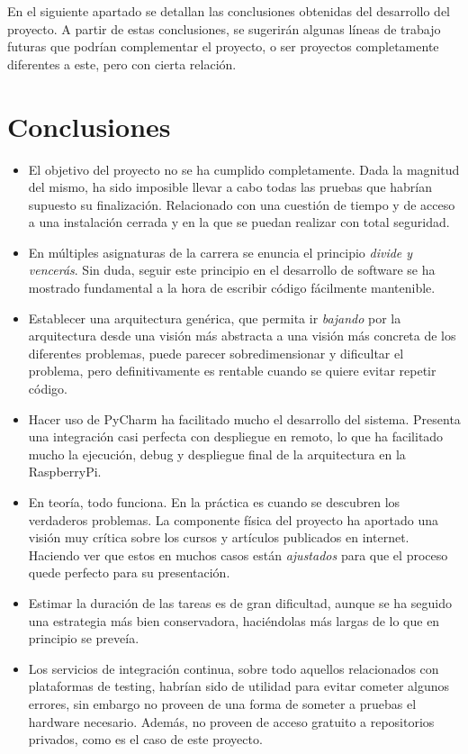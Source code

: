 
En el siguiente apartado se detallan las conclusiones obtenidas del desarrollo del proyecto. A partir de estas conclusiones, se sugerirán algunas líneas de trabajo futuras que podrían complementar el proyecto, o ser proyectos completamente diferentes a este, pero con cierta relación. 

\section{Conclusiones}

\begin{itemize}
\item El objetivo del proyecto no se ha cumplido completamente. Dada la magnitud del mismo, ha sido imposible llevar a cabo todas las pruebas que habrían supuesto su finalización. Relacionado con una cuestión de tiempo y de acceso a una instalación cerrada y en la que se puedan realizar con total seguridad.
\item En múltiples asignaturas de la carrera se enuncia el principio \emph{divide y vencerás}. Sin duda, seguir este principio en el desarrollo de software se ha mostrado fundamental a la hora de escribir código fácilmente mantenible. 
\item Establecer una arquitectura genérica, que permita ir \textit{bajando} por la arquitectura desde una visión más abstracta a una visión más concreta de los diferentes problemas, puede parecer sobredimensionar y dificultar el problema, pero definitivamente es rentable cuando se quiere evitar repetir código.
\item Hacer uso de PyCharm ha facilitado mucho el desarrollo del sistema. Presenta una integración casi perfecta con despliegue en remoto, lo que ha facilitado mucho la ejecución, debug y despliegue final de la arquitectura en la RaspberryPi.
\item En teoría, todo funciona. En la práctica es cuando se descubren los verdaderos problemas. La componente física del proyecto ha aportado una visión muy crítica sobre los cursos y artículos publicados en internet. Haciendo ver que estos en muchos casos están \emph{ajustados} para que el proceso quede perfecto para su presentación.
\item Estimar la duración de las tareas es de gran dificultad, aunque se ha seguido una estrategia más bien conservadora, haciéndolas más largas de lo que en principio se preveía. 
\item Los servicios de integración continua, sobre todo aquellos relacionados con plataformas de testing, habrían sido de utilidad para evitar cometer algunos errores, sin embargo no proveen de una forma de someter a pruebas el hardware necesario. Además, no proveen de acceso gratuito a repositorios privados, como es el caso de este proyecto.

\end{itemize}
